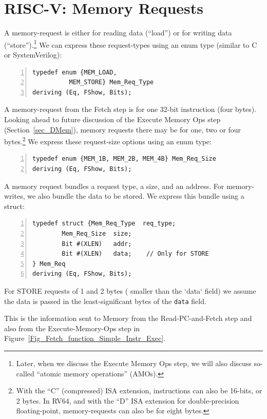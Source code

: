 
\section{RISC-V: Memory Requests}


A memory-request is either for reading data (``load'') or for writing
data (``store'').\footnote{Later, when we discuss the Execute Memory
Ops step, we will also discuss so-called ``atomic memory operations''
(AMOs).} We can express these request-types using an enum type
(similar to C or SystemVerilog):

\begin{Verbatim}[frame=single, numbers=left]
typedef enum {MEM_LOAD,
	      MEM_STORE} Mem_Req_Type
deriving (Eq, FShow, Bits);
\end{Verbatim}

A memory-request from the Fetch step is for one 32-bit instruction
(four bytes). Looking ahead to future discussion of the Execute Memory
Ops step (Section~\ref{sec_DMem}), memory requests there may be for
one, two or four bytes.\footnote{With the ``C'' (compressed) ISA
extension, instructions can also be 16-bits, or 2 bytes.  In RV64, and
with the ``D'' ISA extension for double-precision floating-point,
memory-requests can also be for eight bytes.}  We express these
request-size options using an enum type:

\begin{Verbatim}[frame=single, numbers=left]
typedef enum {MEM_1B, MEM_2B, MEM_4B} Mem_Req_Size
deriving (Eq, FShow, Bits);
\end{Verbatim}

A memory request bundles a request type, a size, and an address.  For
memory-writes, we also bundle the data to be stored.  We express this
bundle using a struct:

\begin{Verbatim}[frame=single, numbers=left]
typedef struct {Mem_Req_Type  req_type;
		Mem_Req_Size  size;
		Bit #(XLEN)   addr;
		Bit #(XLEN)   data;    // Only for STORE
} Mem_Req
deriving (Eq, FShow, Bits);
\end{Verbatim}

For STORE requests of 1 and 2 bytes ({\ie} smaller than the `data`
field) we assume the data is passed in the least-significant bytes of
the \verb|data| field.

This is the information sent to Memory from the Read-PC-and-Fetch step
and also from the Execute-Memory-Ops step in
Figure~\ref{Fig_Fetch_function_Simple_Instr_Exec}.

